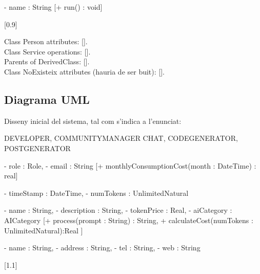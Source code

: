 \documentclass[fake,cover-config=offset,default]{P3CTeX}
\begin{document}
	{
		- name : String
	}
	[+ run() : void]

	[0.9\linewidth]

	Class Person attributes: [].\\
	Class Service operations: [].\\
	Parents of DerivedClass: [].\\

	Class NoExisteix attributes (hauria de ser buit): [].

	\subsection{Diagrama UML}
	Disseny inicial del sistema, tal com s'indica a l'enunciat:

	{
		DEVELOPER,
		COMMUNITYMANAGER
	}
	{
		CHAT,
		CODEGENERATOR,
		POSTGENERATOR
	}

	{
		- role : Role,
		- email : String
	}[+ monthlyConsumptionCost(month : DateTime) : real]

	{
		- timeStamp : DateTime,
		- numTokens : UnlimitedNatural
	}

	{
		- name : String,
		- description : String,
		- tokenPrice : Real,
		- aiCategory : AICategory
	}[+ process(prompt : String) : String, + calculateCost(numTokens : UnlimitedNatural):Real	]

	{
		- name : String,
		- address : String,
		- tel : String,
		- web : String
	}

	[1.1\linewidth]
\end{document}
